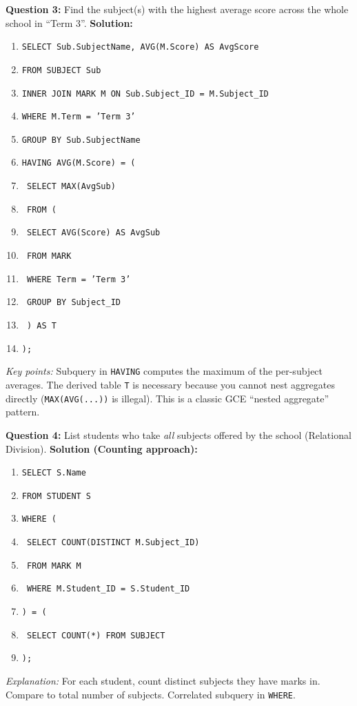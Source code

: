 \documentclass[11pt]{article}
\begin{document}
\begin{exoresolu}
\vspace{0.3cm}
\noindent\textbf{Question 3:} Find the subject(s) with the highest average score across the whole school in ``Term 3''.
\tcblower
\textbf{Solution:}
\begin{enumerate}
\item \texttt{SELECT Sub.SubjectName, AVG(M.Score) AS AvgScore}
\item \texttt{FROM SUBJECT Sub}
\item \texttt{INNER JOIN MARK M ON Sub.Subject\_ID = M.Subject\_ID}
\item \texttt{WHERE M.Term = 'Term 3'}
\item \texttt{GROUP BY Sub.SubjectName}
\item \texttt{HAVING AVG(M.Score) = (}
\item \texttt{    SELECT MAX(AvgSub)}
\item \texttt{    FROM (}
\item \texttt{        SELECT AVG(Score) AS AvgSub}
\item \texttt{        FROM MARK}
\item \texttt{        WHERE Term = 'Term 3'}
\item \texttt{        GROUP BY Subject\_ID}
\item \texttt{    ) AS T}
\item \texttt{);}
\end{enumerate}
\textit{Key points:} Subquery in \texttt{HAVING} computes the maximum of the per-subject averages. The derived table \texttt{T} is necessary because you cannot nest aggregates directly (\texttt{MAX(AVG(...))} is illegal). This is a classic GCE ``nested aggregate'' pattern.

\vspace{0.3cm}
\noindent\textbf{Question 4:} List students who take \emph{all} subjects offered by the school (Relational Division).
\tcblower
\textbf{Solution (Counting approach):}
\begin{enumerate}
\item \texttt{SELECT S.Name}
\item \texttt{FROM STUDENT S}
\item \texttt{WHERE (}
\item \texttt{    SELECT COUNT(DISTINCT M.Subject\_ID)}
\item \texttt{    FROM MARK M}
\item \texttt{    WHERE M.Student\_ID = S.Student\_ID}
\item \texttt{) = (}
\item \texttt{    SELECT COUNT(*) FROM SUBJECT}
\item \texttt{);}
\end{enumerate}
\textit{Explanation:} For each student, count distinct subjects they have marks in. Compare to total number of subjects. Correlated subquery in \texttt{WHERE}.
\end{exoresolu}
\end{document}
